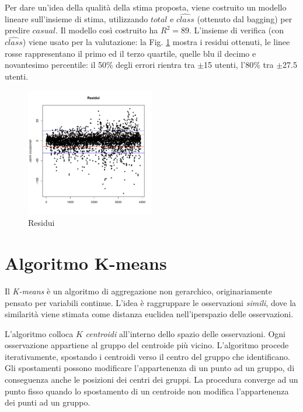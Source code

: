 \documentclass[a4paper, 10pt]{report}
\begin{document}
Per dare un'idea della qualità della stima proposta, viene costruito un
modello lineare sull'insieme di stima, utilizzando $total$ e $\widehat{class}$
(ottenuto dal bagging) per predire $casual$. Il modello così costruito ha
$R^2 = 89$. L'insieme di verifica (con $\widehat{class}$) viene usato per la
valutazione: la Fig. \ref{fig:classification-residuals} mostra i residui
ottenuti, le linee rosse rappresentano il primo ed il terzo quartile, quelle
blu il decimo e novantesimo percentile: il 50\% degli errori rientra tra
$\pm$15 utenti, l'80\% tra $\pm$27.5 utenti.

\begin{figure}
  \centering
  \includegraphics[width=0.5\textwidth]{../plots/classification-residuals.pdf}
  \caption{Residui}
  \label{fig:classification-residuals}
\end{figure}




\chapter{Algoritmo K-means}
\label{app:k-means}
Il \emph{K-means} è un algoritmo di aggregazione non gerarchico,
originariamente pensato per variabili continue. L'idea è raggruppare le
osservazioni \emph{simili}, dove la similarità viene stimata come
distanza euclidea nell'iperspazio delle osservazioni.

L'algoritmo colloca $K$ \emph{centroidi} all'interno dello spazio
delle osservazioni. Ogni osservazione appartiene al gruppo del centroide
più vicino. L'algoritmo procede iterativamente, spostando i centroidi
verso il centro del gruppo che identificano. Gli spostamenti possono
modificare l'appartenenza di un punto ad un gruppo, di conseguenza anche
le posizioni dei centri dei gruppi. La procedura converge ad un punto fisso
quando lo spostamento di un centroide non modifica l'appartenenza dei
punti ad un gruppo.
\end{document}
